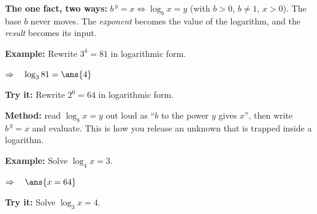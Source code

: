 \documentclass[12pt]{article}
\begin{document}


\begin{formulabox}
\textbf{The one fact, two ways:} \quad
$b^{\,y} = x \iff \log_b x = y$ \quad (with $b > 0$, $b \ne 1$, $x > 0$).
The base $b$ never moves. The \emph{exponent} becomes the value of the logarithm,
and the \emph{result} becomes its input.
\end{formulabox}

\begin{examplebox}
\textbf{Example:} \quad Rewrite $3^4 = 81$ in logarithmic form.

$\Rightarrow\quad \log_3 81 = \ans{4}$
\end{examplebox}

\begin{tryitbox}
\textbf{Try it:} \quad Rewrite $2^6 = 64$ in logarithmic form.\\[2pt]
\end{tryitbox}


\begin{formulabox}
\textbf{Method:} read $\log_b x = y$ out loud as ``$b$ to the power $y$ gives
$x$'', then write $b^{\,y} = x$ and evaluate. This is how you release an unknown
that is trapped inside a logarithm.
\end{formulabox}

\begin{examplebox}
\textbf{Example:} \quad Solve $\log_4 x = 3$.

$\Rightarrow\quad \ans{x = 64}$
\end{examplebox}

\begin{tryitbox}
\textbf{Try it:} \quad Solve $\log_3 x = 4$.\\[2pt]
\end{tryitbox}
\end{document}
